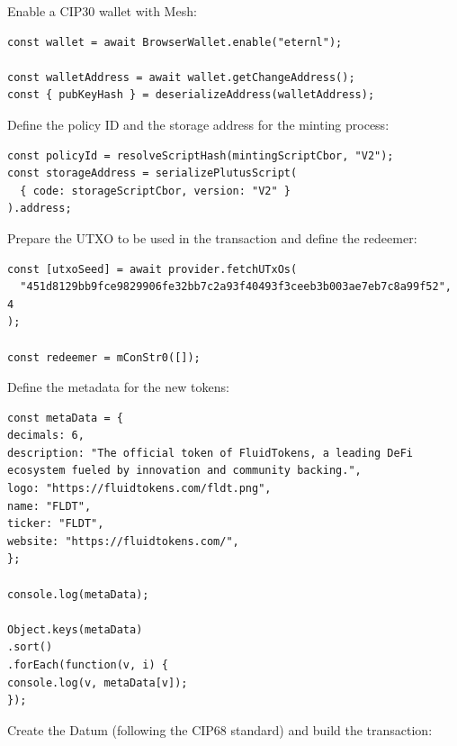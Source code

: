 Enable a CIP30 wallet with Mesh:

\begin{lstlisting}
const wallet = await BrowserWallet.enable("eternl");

const walletAddress = await wallet.getChangeAddress();
const { pubKeyHash } = deserializeAddress(walletAddress);
\end{lstlisting}

Define the policy ID and the storage address for the minting process:

\begin{lstlisting}
const policyId = resolveScriptHash(mintingScriptCbor, "V2");
const storageAddress = serializePlutusScript(
  { code: storageScriptCbor, version: "V2" }
).address;
\end{lstlisting}

Prepare the UTXO to be used in the transaction and define the redeemer:

\begin{lstlisting}
const [utxoSeed] = await provider.fetchUTxOs(
  "451d8129bb9fce9829906fe32bb7c2a93f40493f3ceeb3b003ae7eb7c8a99f52", 4
);

const redeemer = mConStr0([]);
\end{lstlisting}

Define the metadata for the new tokens:

\begin{lstlisting}
const metaData = {
decimals: 6,
description: "The official token of FluidTokens, a leading DeFi ecosystem fueled by innovation and community backing.",
logo: "https://fluidtokens.com/fldt.png",
name: "FLDT",
ticker: "FLDT",
website: "https://fluidtokens.com/",
};

console.log(metaData);

Object.keys(metaData)
.sort()
.forEach(function(v, i) {
console.log(v, metaData[v]);
});
\end{lstlisting}

Create the Datum (following the CIP68 standard) and build the transaction:

